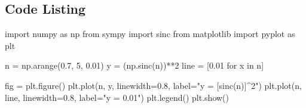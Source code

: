 \documentclass{article}
\begin{document}
\begin{appendices}
\section{Code Listing}
\begin{python}
    import numpy as np
    from sympy import sinc
    from matplotlib import pyplot as plt

    n = np.arange(0.7, 5, 0.01)
    y = (np.sinc(n))**2
    line = [0.01 for x in n]

    fig = plt.figure()
    plt.plot(n, y, linewidth=0.8, label="y = [sinc(n)]^2")
    plt.plot(n, line, linewidth=0.8, label="y = 0.01")
    plt.legend()
    plt.show()
\end{python}

\end{appendices}
\end{document}
